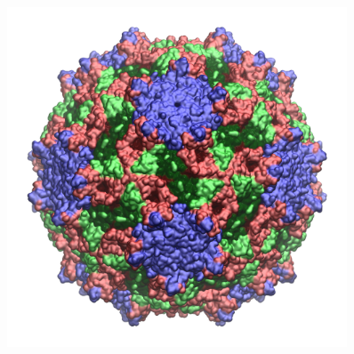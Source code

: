 \documentclass[8pt]{beamer}
\begin{document}
\begin{frame}[t]
\begin{minipage}[t]{0.4\textwidth}
{\begin{figure}[ht]
    \includegraphics[width=0.9\textwidth]{Figure/TrV_Capsid.png}
\end{figure}}
\end{minipage}
\end{frame}
\end{document}
